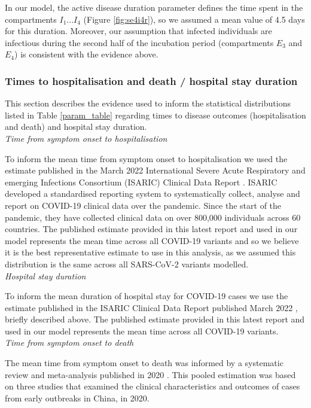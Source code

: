 In our model, the active disease duration parameter defines the time spent in the compartments $I_1...I_4$ (Figure \ref{fig:se4i4r}), 
so we assumed a mean value of 4.5 days for this duration. Moreover, our assumption that infected individuals are infectious during 
the second half of the incubation period (compartments $E_3$ and $E_4$) is consistent with the evidence above. 


\subsubsection{Times to hospitalisation and death / hospital stay duration}
This section describes the evidence used to inform the statistical distributions listed in Table \ref{param_table}
regarding times to disease outcomes (hospitalisation and death) and hospital stay duration.\\

\textit{Time from symptom onset to hospitalisation}

To inform the mean time from symptom onset to hospitalisation we used the estimate published in the March 2022 International Severe Acute Respiratory 
and emerging Infections Consortium (ISARIC) Clinical Data Report \cite{isaric2022}. ISARIC developed a standardised reporting system to systematically 
collect, analyse and report on COVID-19 clinical data over the pandemic. Since the start of the pandemic, they have collected clinical data on over 
800,000 individuals across 60 countries. The published estimate provided in this latest report and used in our model represents the mean time 
across all COVID-19 variants and so we believe it is the best representative estimate to use in this analysis, as we assumed this distribution is the 
same across all SARS-CoV-2 variants modelled.\\

\textit{Hospital stay duration}

To inform the mean duration of hospital stay for COVID-19 cases we use the estimate published in the ISARIC Clinical Data Report published March 2022 \cite{isaric2022}, briefly described above. 
The published estimate provided in this latest report and used in our model represents the mean time across all COVID-19 
variants.\\

\textit{Time from symptom onset to death}

The mean time from symptom onset to death was informed by a systematic review and meta-analysis published in 2020 \cite{khalili2020}. This pooled estimation was based on three studies 
that examined the clinical characteristics and outcomes of cases from early outbreaks in China, in 2020.


